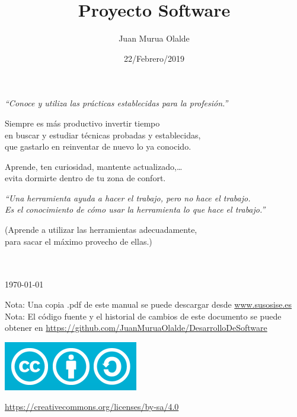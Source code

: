 \documentclass[spanish,12pt,a4paper,final,oneside]{book}
\title{Proyecto Software}
\author{Juan Murua Olalde}
\date{22/Febrero/2019}
\begin{document}
\begin{titlepage}

\begin{flushright}
\vspace{2cm}
\begin{Huge}\MyTitle \end{Huge}
\end{flushright}


\begin{flushleft}
\vspace{0.3cm}
\textit{``Conoce y utiliza las prácticas establecidas para la profesión.''}

\begin{footnotesize}Siempre es más productivo invertir tiempo\\ en buscar y estudiar técnicas probadas y establecidas,\\ que gastarlo en reinventar de nuevo lo ya conocido.

Aprende, ten curiosidad, mantente actualizado,\ldots\\ evita dormirte dentro de tu zona de confort.\end{footnotesize}

\vspace{0.5cm}
\textit{``Una herramienta ayuda a hacer el trabajo, pero no hace el trabajo.\\ Es el conocimiento de cómo usar la herramienta lo que hace el trabajo.''}

\begin{footnotesize}(Aprende a utilizar las herramientas adecuadamente,\\ para sacar el máximo provecho de ellas.)\end{footnotesize}
\end{flushleft}

\begin{flushright}
\vspace{1cm}
\MyAuthor
\\
\vspace{1cm}
\MyDate
\\ \today
\end{flushright}

\vfill
Nota: Una copia .pdf de este manual se puede descargar desde \url{www.susosise.es}
\\Nota: El código fuente y el historial de cambios de este documento se puede obtener en \url{https://github.com/JuanMuruaOlalde/DesarrolloDeSoftware}
\begin{flushleft}
\includegraphics[scale=0.3]{CreativeCommons-Attribution-ShareAlike-logo}
\begin{small}\url{https://creativecommons.org/licenses/by-sa/4.0}\end{small}
\end{flushleft}

\end{titlepage}
\end{document}
